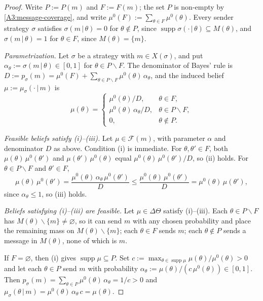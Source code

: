 \documentclass[11pt]{article}
\newcommand{\sep}{\,|\,}
\newcommand{\supp}{\operatorname{supp}}
\begin{document}
\begin{proof}
    Write $P:=P(m)$ and $F:=F(m)$; the set $P$ is non-empty by \cref{A3:message-coverage}, and write $\mu^0(F):=\sum_{\theta\in F}\mu^0(\theta)$. Every sender strategy $\sigma$ satisfies $\sigma(m\sep\theta)=0$ for $\theta\notin P$, since $\supp\sigma(\cdot\sep\theta)\subseteq M(\theta)$, and $\sigma(m\sep\theta)=1$ for $\theta\in F$, since $M(\theta)=\{m\}$.

    \emph{Parametrization.} Let $\sigma$ be a strategy with $m\in X(\sigma)$, and put $\alpha_\theta:=\sigma(m\sep\theta)\in[0,1]$ for $\theta\in P\smallsetminus F$. The denominator of Bayes' rule is $D:=p_\sigma(m)=\mu^0(F)+\sum_{\theta\in P\smallsetminus F}\mu^0(\theta)\,\alpha_\theta$, and the induced belief $\mu:=\mu_\sigma(\cdot\sep m)$ is
    \[
        \mu(\theta)=
        \begin{cases}
            \mu^0(\theta)/D, & \theta\in F,\\
            \mu^0(\theta)\,\alpha_\theta/D, & \theta\in P\smallsetminus F,\\
            0, & \theta\notin P.
        \end{cases}
    \]

    \emph{Feasible beliefs satisfy \textup{(i)--(iii)}.} Let $\mu\in\mathcal{F}(m)$, with parameter $\alpha$ and denominator $D$ as above. Condition (i) is immediate. For $\theta,\theta'\in F$, both $\mu(\theta)\,\mu^0(\theta')$ and $\mu(\theta')\,\mu^0(\theta)$ equal $\mu^0(\theta)\,\mu^0(\theta')/D$, so (ii) holds. For $\theta\in P\smallsetminus F$ and $\theta'\in F$,
    \[
        \mu(\theta)\,\mu^0(\theta')=\frac{\mu^0(\theta)\,\alpha_\theta\,\mu^0(\theta')}{D}\leq\frac{\mu^0(\theta)\,\mu^0(\theta')}{D}=\mu^0(\theta)\,\mu(\theta'),
    \]
    since $\alpha_\theta\leq1$, so (iii) holds.

    \emph{Beliefs satisfying \textup{(i)--(iii)} are feasible.} Let $\mu\in\Delta\Theta$ satisfy (i)--(iii). Each $\theta\in P\smallsetminus F$ has $M(\theta)\smallsetminus\{m\}\neq\varnothing$, so it can send $m$ with any chosen probability and place the remaining mass on $M(\theta)\smallsetminus\{m\}$; each $\theta\in F$ sends $m$; each $\theta\notin P$ sends a message in $M(\theta)$, none of which is $m$.

    If $F=\varnothing$, then (i) gives $\supp\mu\subseteq P$. Set $c:=\max_{\theta\in\supp\mu}\mu(\theta)/\mu^0(\theta)>0$ and let each $\theta\in P$ send $m$ with probability $\alpha_\theta:=\mu(\theta)/(c\,\mu^0(\theta))\in[0,1]$. Then $p_\sigma(m)=\sum_{\theta\in P}\mu^0(\theta)\,\alpha_\theta=1/c>0$ and $\mu_\sigma(\theta\sep m)=\mu^0(\theta)\,\alpha_\theta\,c=\mu(\theta)$.


\end{proof}
\end{document}
